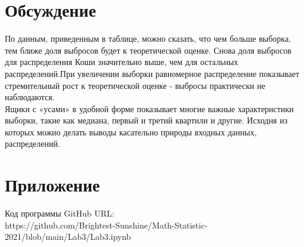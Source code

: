 \documentclass[a4paper]{article}
\begin{document}
\section{Обсуждение}
\noindent По данным, приведенным в таблице, можно сказать, что чем больше выборка, тем ближе доля выбросов будет к теоретической оценке. Снова доля выбросов для распределения Коши значительно выше, чем для остальных распределений.При увеличении выборки равномерное распределение показывает стремительный рост к теоретической оценке - выбросы практически не наблюдаются.\\

\noindent Ящики с «усами» в удобной форме показывает многие важные характеристики выборки, такие как медиана, первый и третий квартили и другие. Исходня из которых можно делать выводы касательно природы входных данных, распределений.

\section{Приложение}

\noindent Код программы GitHub URL:\\
\newline https://github.com/Brightest-Sunshine/Math-Statistic-2021/blob/main/Lab3/Lab3.ipynb
\end{document}
